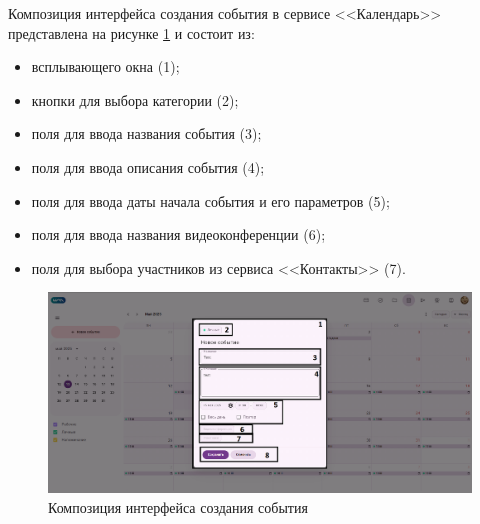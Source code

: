Композиция интерфейса создания события в сервисе <<Календарь>> представлена на рисунке \ref{templ:image3b} и состоит из:
\begin{itemize}
  \item всплывающего окна (1);
  \item кнопки для выбора категории (2);
  \item поля для ввода названия события (3);
  \item поля для ввода описания события (4);
  \item поля для ввода даты начала события и его параметров (5);
  \item поля для ввода названия видеоконференции (6);
  \item поля для выбора участников из сервиса <<Контакты>> (7).
\end{itemize}
\begin{figure}[H]
	\centering
	\includegraphics[width=1\linewidth]{images/календарь2}
	\caption{Композиция интерфейса создания события}
	\label{templ:image3b}
\end{figure}


